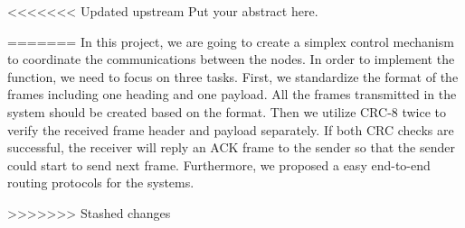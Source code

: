 <<<<<<< Updated upstream
Put your abstract here.

=======
In this project, we are going to create a simplex control mechanism to coordinate the communications between the nodes. In order to implement the function, we need to focus on three tasks.  First, we standardize the format of the frames including one heading and one payload. All the frames transmitted in the system should be created based on the format. Then we utilize CRC-8 twice to verify the received frame header and payload separately. If both CRC checks are successful, the receiver will reply an ACK frame to the sender so that the sender could start to send next frame. Furthermore, we proposed a easy end-to-end routing protocols for the systems. 


>>>>>>> Stashed changes
